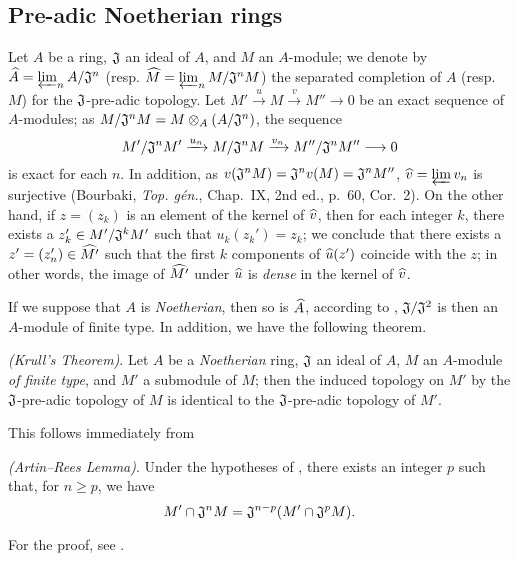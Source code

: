 \subsection{Pre-adic Noetherian rings}
\label{subsection:pre-adic-noetherian-rings}

\begin{env}[7.3.1]
\label{0.7.3.1}
Let $A$ be a ring, $\mathfrak{J}$ an ideal of $A$, and $M$ an $A$-module; we denote by
$\widehat{A}=\varprojlim_n A/\mathfrak{J}^n$
(resp. $\widehat{M}=\varprojlim_n M/\mathfrak{J}^n M$) the separated completion of $A$
(resp. $M$) for the $\mathfrak{J}$-pre-adic topology. Let
$M'\xrightarrow{u}M\xrightarrow{v}M''\to 0$ be an exact sequence of $A$-modules; as
$M/\mathfrak{J}^n M=M\otimes_A(A/\mathfrak{J}^n)$, the sequence
\[
  M'/\fk{J}^n M'\xrightarrow{u_n}M/\fk{J}^n M\xrightarrow{v_n}M''/\fk{J}^n M''\to 0
\]
is exact for each $n$. In addition, as
$v(\mathfrak{J}^n M)=\mathfrak{J}^n v(M)=\mathfrak{J}^n M''$,
$\widehat{v}=\varprojlim v_n$ is surjective (Bourbaki, \emph{Top. g\'en.}, Chap.~IX,
2nd ed., p.~60, Cor.~2). On the other hand, if $z=(z_k)$ is an element of the kernel of
$\widehat{v}$, then for each integer $k$, there exists a $z_k'\in M'/\mathfrak{J}^k M'$
such that $u_k(z_k')=z_k$; we conclude that there exists  a $z'=(z_n')\in\widehat{M'}$
such that the first $k$ components of $\widehat{u}(z')$ coincide with the $z$; in other
words, the image of $\widehat{M'}$ under $\widehat{u}$ is \emph{dense} in the kernel of
$\widehat{v}$.

If we suppose that $A$ is \emph{Noetherian}, then so is $\widehat{A}$, according to
, $\mathfrak{J}/\mathfrak{J}^2$ is then an $A$-module of
finite type. In addition, we have the following theorem.
\end{env}

\begin{thm}[7.3.2]
\label{0.7.3.2}
\emph{(Krull's Theorem)}. Let $A$ be a \emph{Noetherian} ring, $\mathfrak{J}$ an ideal of
$A$, $M$ an $A$-module \emph{of finite type}, and $M'$ a submodule of $M$; then the induced
topology on $M'$ by the $\mathfrak{J}$-pre-adic topology of $M$ is identical to the
$\mathfrak{J}$-pre-adic topology of $M'$.
\end{thm}

This follows immediately from
\begin{lem}[7.3.2.1]
\label{0.7.3.2.1}
\emph{(Artin--Rees Lemma)}. Under the hypotheses of , there
exists an integer $p$ such that, for $n\geqslant p$, we have
\[
  M'\cap\mathfrak{J}^n M=\mathfrak{J}^{n-p}(M'\cap\mathfrak{J}^p M).
\]
\end{lem}

For the proof, see \cite[p.~2--04]{I-1}.

